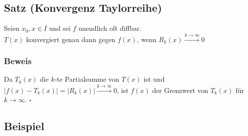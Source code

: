 \documentclass[a4paper, 12pt,titlepage, pdf, headsepline]{scrartcl}
\newcommand{\qed}{\hfill$\square$}
\renewcommand{\>}{\rightarrow}
\renewcommand{\*}{\cdot}
\begin{document}
\subsection{Satz (Konvergenz Taylorreihe)}
\label{12.8}
Seien $x_0, x \in I$ und sei $f$ unendlich oft diffbar. \\
$T(x)$ konvergiert genau dann gegen $f(x)$, wenn $R_k(x) \overset{k \rightarrow \infty}{\rightarrow} 0$
\subsubsection*{Beweis}
Da $T_k(x)$ die $k$-te Partialsumme von $T(x)$ ist und $|f(x) - T_k(x)| = |R_k(x)| \overset{k \rightarrow \infty}{\rightarrow} 0$, ist $f(x)$ der Grenzwert von $T_k(x)$ für $k \rightarrow \infty$. \qed
\subsection{Beispiel}
\end{document}
